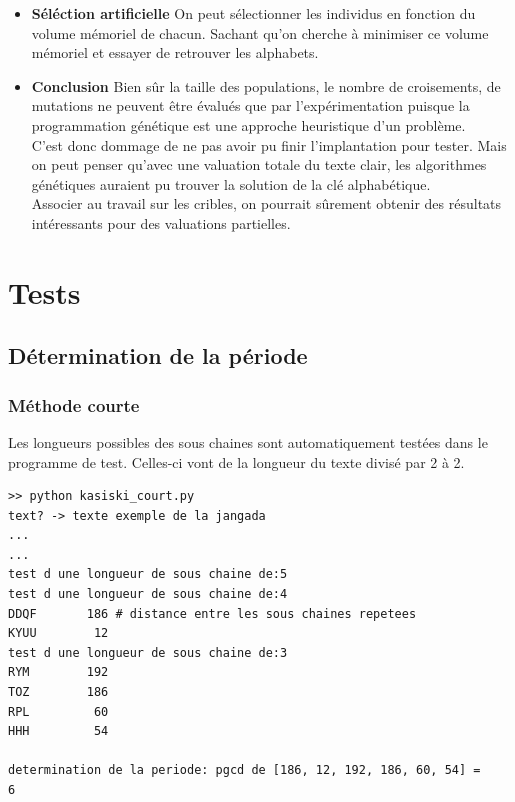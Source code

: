 \documentclass[a4paper, 11pt]{article}
\begin{document}
\begin{itemize}
\item \textbf{Séléction artificielle}
On peut sélectionner les individus en fonction du volume mémoriel de
chacun. Sachant qu'on cherche à minimiser ce volume mémoriel et
essayer de retrouver les alphabets.\\

\item \textbf{Conclusion}
Bien sûr la taille des populations, le nombre de croisements, de
mutations ne peuvent être évalués que par l'expérimentation puisque la
programmation génétique est une approche heuristique d'un problème.\\
C'est donc dommage de ne pas avoir pu finir l'implantation pour
tester. Mais on peut penser qu'avec une valuation totale du texte
clair, les algorithmes génétiques auraient pu trouver la solution de
la clé alphabétique.\\

Associer au travail sur les cribles, on pourrait sûrement
obtenir des résultats intéressants pour des valuations partielles.
\end{itemize}



\section{Tests}

\subsection{Détermination de la période}

\subsubsection{Méthode courte}

Les longueurs possibles des sous chaines sont automatiquement testées
dans le programme de test.
Celles-ci vont de la longueur du texte divisé par 2 à 2.\\

\begin{lstlisting}
>> python kasiski_court.py
text? -> texte exemple de la jangada
...
...
test d une longueur de sous chaine de:5
test d une longueur de sous chaine de:4
DDQF       186 # distance entre les sous chaines repetees
KYUU        12
test d une longueur de sous chaine de:3
RYM        192
TOZ        186
RPL         60
HHH         54

determination de la periode: pgcd de [186, 12, 192, 186, 60, 54] =
6
\end{lstlisting}
\end{document}
